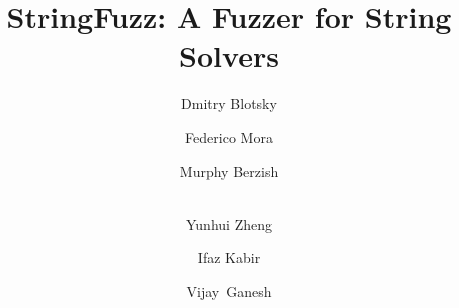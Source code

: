\documentclass[runningheads]{llncs}
\def\fuzzer{StringFuzz}
\begin{document}
    \title{\fuzzer{}: A Fuzzer for String Solvers}

   \author{
       Dmitry Blotsky \and
       Federico Mora \and
       Murphy Berzish \and \\
       Yunhui Zheng \and
       Ifaz Kabir \and
       Vijay~Ganesh
   }


    \maketitle

    
    
    
    
    
    

    \newpage
    
    
\end{document}
